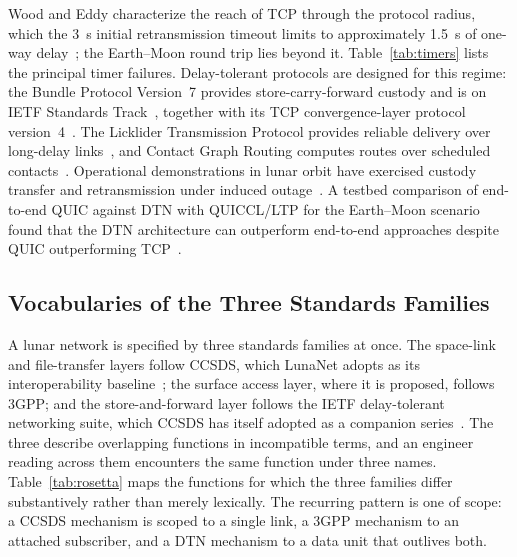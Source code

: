 \documentclass[11pt,a4paper]{article}
\begin{document}
Wood and Eddy characterize the reach of TCP through the protocol radius, which the \SI{3}{\second} initial retransmission timeout limits to approximately \SI{1.5}{\second} of one-way delay~\cite{wood_tcp_radius}; the Earth--Moon round trip lies beyond it. Table~\ref{tab:timers} lists the principal timer failures. Delay-tolerant protocols are designed for this regime: the Bundle Protocol Version~7 provides store-carry-forward custody and is on IETF Standards Track~\cite{rfc9171}, together with its TCP convergence-layer protocol version~4~\cite{rfc9174}. The Licklider Transmission Protocol provides reliable delivery over long-delay links~\cite{rfc5326}, and Contact Graph Routing computes routes over scheduled contacts~\cite{burleigh_cgr}. Operational demonstrations in lunar orbit have exercised custody transfer and retransmission under induced outage~\cite{kim_kplo_dtn}. A testbed comparison of end-to-end QUIC against DTN with QUICCL/LTP for the Earth--Moon scenario found that the DTN architecture can outperform end-to-end approaches despite QUIC outperforming TCP~\cite{e2e_vs_dtn_2026}.

\subsection{Vocabularies of the Three Standards Families}
A lunar network is specified by three standards families at once. The space-link and file-transfer layers follow CCSDS, which LunaNet adopts as its interoperability baseline~\cite{lnis_v5,ccsds_lunar_standards}; the surface access layer, where it is proposed, follows 3GPP; and the store-and-forward layer follows the IETF delay-tolerant networking suite, which CCSDS has itself adopted as a companion series~\cite{ccsds_bp,ccsds_ltp}. The three describe overlapping functions in incompatible terms, and an engineer reading across them encounters the same function under three names. Table~\ref{tab:rosetta} maps the functions for which the three families differ substantively rather than merely lexically. The recurring pattern is one of scope: a CCSDS mechanism is scoped to a single link, a 3GPP mechanism to an attached subscriber, and a DTN mechanism to a data unit that outlives both.
\end{document}
